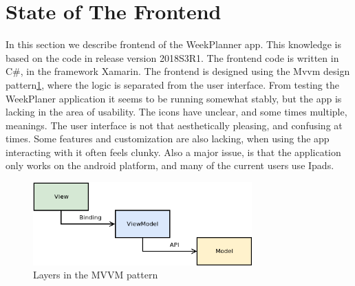 \section{State of The Frontend} \label{sec:StateFrontend}

In this section we describe frontend of the WeekPlanner app. This knowledge is based on the code in release version 2018S3R1. 
The frontend code is written in C\#, in the framework Xamarin. The frontend is designed using the \gls{Mvvm} design pattern\ref{fig:MVVM}, where the logic is separated from the user interface. 
From testing the WeekPlaner application it seems to be running somewhat stably,  but the app is lacking in the area of usability. The icons have unclear, and some times multiple, meanings. The user interface is not that aesthetically pleasing, and confusing at times. Some features and customization are also lacking, when using the app interacting with it often feels clunky.
Also a major issue, is that the application only works on the android platform, and many of the current users use Ipads.

\begin{figure}[ht]
    \begin{small}
        \begin{center}
            \includegraphics[width=0.75\textwidth]{figures/MVVM_diagram}
        \end{center}
        \caption{Layers in the MVVM pattern}
        \label{fig:MVVM}
    \end{small}
\end{figure}

